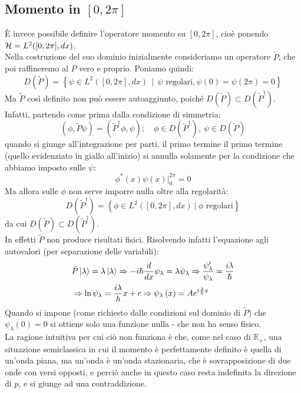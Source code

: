 \documentclass[../../FisicaTeorica.tex]{subfiles}
\begin{document}
\subsection{Momento in $[0,2\pi]$}
\label{sec:momento_compatto}
È invece possibile definire l'operatore momento su $[0,2\pi]$, cioè ponendo $\mathcal{H} = L^2([0,2\pi],dx)$.\\
Nella costruzione del suo dominio inizialmente consideriamo un operatore  $\tilde{P}$, che poi raffineremo al $P$ vero e proprio. Poniamo quindi:
\[
D\left(\widetilde{P}\right)= \left\{\psi\in L^2\left(\left[0,2\pi\right],dx\right)\ \ |\ \ \psi\text{ regolari},\psi\left(0\right)=\psi\left(2\pi\right)=0\right\}
\]
Ma $\widetilde{P}$ così definito non può essere autoaggiunto, poiché $D(\widetilde{P})\subset D({\widetilde{P}}^\dag)$. Infatti, partendo come prima dalla condizione di simmetria:
\[
\left(\phi,\tilde{P}\psi\right)=(\tilde{P}^\dag\phi,\psi);\quad \phi\in D(\tilde{P}^\dag), \> \psi \in D(\tilde{P})
\]
quando si giunge all'integrazione per parti, il primo termine il primo termine (quello evidenziato in giallo all'inizio) si annulla solamente per la condizione che abbiamo imposto sulle $\psi$:
\[
\phi^\ast\left(x\right)\psi\left(x\right)\big|_0^{2\pi}=0
\]
Ma allora sulle $\phi$ non serve imporre nulla oltre alla regolarità:
\[
D\left({\widetilde{P}}^\dag\right)=\left\{\phi\in L^2\left(\left[0,2\pi\right],dx\right)\ |\ \phi\text{ regolari}\right\}
\]
da cui $D(\tilde{P})\subset D(\tilde{P}^\dag)$.\\
In effetti $\tilde{P}$ non produce risultati fisici. Risolvendo infatti l'equazione agli autovalori (per separazione delle variabili):
\begin{align*}
    &\tilde{P}\ket{\lambda} = \lambda \ket{\lambda} \Rightarrow -i\hbar\frac{d}{dx}\psi_\lambda = \lambda\psi_\lambda \Rightarrow \frac{\psi_\lambda'}{\psi_\lambda} = \frac{i\lambda}{\hbar}\\
    &\Rightarrow \ln \psi_\lambda = \frac{i\lambda}{\hbar}x + c \Rightarrow \psi_\lambda\left(x\right)=A e^{i\frac{\lambda}{\hbar}x}
\end{align*}
Quando si impone (come richiesto dalle condizioni sul dominio di $\tilde{P}$) che $\psi_\lambda\left(0\right)=0$ si ottiene solo una funzione nulla - che non ha senso fisico.\\
La ragione intuitiva per cui ciò non funziona è che, come nel caso di $\mathbb{R}_+$, una situazione semiclassica in cui il momento è perfettamente definito è quella di un'onda piana, ma un'onda  è un'onda stazionaria, che è sovrapposizione di due onde con versi opposti, e perciò anche in questo caso resta indefinita la direzione di $p$, e si giunge ad una contraddizione.\\
\end{document}

